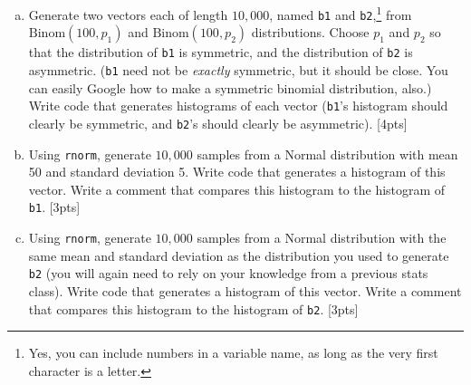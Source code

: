 \documentclass[12pt]{article}
\newcommand{\Binom}{\text{Binom}}
\begin{document}
\begin{enumerate}[(a)]
	\item Generate two vectors each of length $10,000$, named \verb|b1| and \verb|b2|,\footnote{Yes, you can include numbers in a variable name, as long as the very first character is a letter.} from $\Binom(100,p_1)$ and $\Binom(100,p_2)$ distributions. Choose $p_1$ and $p_2$ so that the distribution of \verb|b1| is symmetric, and the distribution of \verb|b2| is asymmetric. (\verb|b1| need not be \textit{exactly} symmetric, but it should be close. You can easily Google how to make a symmetric binomial distribution, also.) Write code that generates histograms of each vector (\verb|b1|'s histogram should clearly be symmetric, and \verb|b2|'s should clearly be asymmetric). [4pts]
	\item Using \verb|rnorm|, generate $10,000$ samples from a Normal distribution with mean 50 and standard deviation 5. Write code that generates a histogram of this vector. Write a comment that compares this histogram to the histogram of \verb|b1|. [3pts]
	\item Using \verb|rnorm|, generate $10,000$ samples from a Normal distribution with the same mean and standard deviation as the distribution you used to generate \verb|b2| (you will again need to rely on your knowledge from a previous stats class). Write code that generates a histogram of this vector. Write a comment that compares this histogram to the histogram of \verb|b2|. [3pts]
\end{enumerate}
\end{document}
